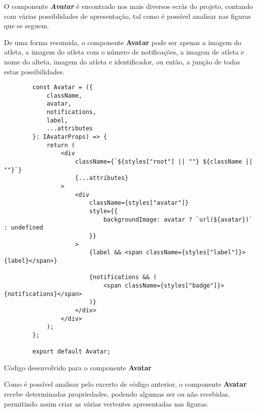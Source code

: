 \label{avatarComp}

O componente \textbf{\textit{Avatar}} é encontrado nos mais diversos ecrãs do projeto, contando com várias possiblidades de apresentação, tal como é possível analisar nas figuras que se seguem.

\begin{minipage}{0.55\textwidth}
\end{minipage}
\begin{minipage}{0.35\textwidth}
\end{minipage}


De uma forma resumida, o componente \textbf{Avatar} pode ser apenas a imagem do atleta, a imagem do atleta com o número de notificações, a imagem de atleta e nome do alteta, imagem do atleta e identificador, ou então, a junção de todas estas possibilidades.

\begin{longlisting}
	\begin{verbatim}
		const Avatar = ({
			className,
			avatar,
			notifications,
			label,
			...attributes
		}: IAvatarProps) => {
			return (
				<div
					className={`${styles["root"] || ""} ${className || ""}`}
					{...attributes}
				>
					<div
						className={styles["avatar"]}
						style={{
							backgroundImage: avatar ? `url(${avatar})` : undefined
						}}
					>
						{label && <span className={styles["label"]}>{label}</span>}

						{notifications && (
							<span className={styles["badge"]}>{notifications}</span>
						)}
					</div>
				</div>
			);
		};

		export default Avatar;
	\end{verbatim}

	\caption{Código desenvolvido para o componente \textbf{Avatar}}
\end{longlisting}

Como é possível analisar pelo excerto de código anterior, o componente \textbf{Avatar} recebe determinadas propriedades, podendo algumas ser ou não recebidas, permitindo assim criar as várias vertentes apresentadas nas figuras.